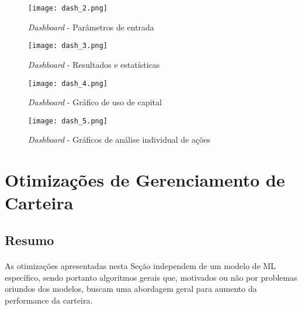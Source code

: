 \begin{figure}[!htb]
    \texttt{[image: dash\_2.png]}
    \centering
    \caption{\textit{Dashboard} - Parâmetros de entrada}
    \label{fig:172}
\end{figure}

\begin{figure}[!htb]
    \texttt{[image: dash\_3.png]}
    \centering
    \caption{\textit{Dashboard} - Resultados e estatísticas}
    \label{fig:173}
\end{figure}

\begin{figure}[!htb]
    \texttt{[image: dash\_4.png]}
    \centering
    \caption{\textit{Dashboard} - Gráfico de uso de capital}
    \label{fig:174}
\end{figure}

\begin{figure}[!htb]
    \texttt{[image: dash\_5.png]}
    \centering
    \caption{\textit{Dashboard} - Gráficos de análise individual de ações }
    \label{fig:175}
\end{figure}



\FloatBarrier
\section{Otimizações de Gerenciamento de Carteira}



\FloatBarrier
\subsection{Resumo}

\paragraph{} As otimizações apresentadas nesta Seção independem de um modelo de ML específico, sendo portanto algoritmos gerais que, motivados ou não por problemas oriundos dos modelos, buscam uma abordagem geral para aumento da performance da carteira.





